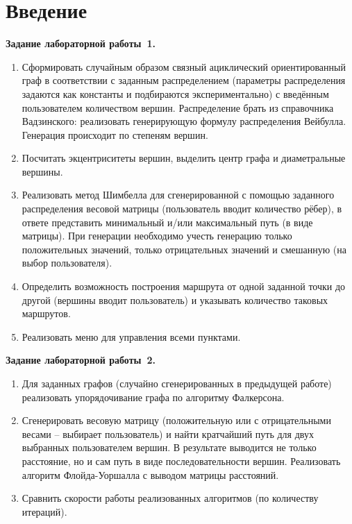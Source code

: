 \section*{Введение}

\textbf{Задание лабораторной работы~1.}
\begin{enumerate}
    \item Сформировать случайным образом связный ациклический ориентированный граф
    в соответствии с заданным распределением (параметры распределения задаются как
    константы и подбираются экспериментально) с введённым пользователем количеством
    вершин. Распределение брать из справочника Вадзинского: реализовать генерирующую
    формулу распределения Вейбулла. Генерация происходит по степеням вершин.

    \item Посчитать экцентриситеты вершин, выделить центр графа и диаметральные вершины.

    \item Реализовать метод Шимбелла для сгенерированной с помощью заданного распределения
    весовой матрицы (пользователь вводит количество рёбер), в ответе представить минимальный
    и/или максимальный путь (в виде матрицы). При генерации необходимо учесть генерацию
    только положительных значений, только отрицательных значений и смешанную (на выбор
    пользователя).

    \item Определить возможность построения маршрута от одной заданной точки до другой
    (вершины вводит пользователь) и указывать количество таковых маршрутов.

    \item Реализовать меню для управления всеми пунктами.
\end{enumerate}

\textbf{Задание лабораторной работы~2.}
\begin{enumerate}
    \item Для заданных графов (случайно сгенерированных в предыдущей работе)
    реализовать упорядочивание графа по алгоритму Фалкерсона.

    \item Сгенерировать весовую матрицу (положительную или с отрицательными весами --
    выбирает пользователь) и найти кратчайший путь для двух выбранных пользователем
    вершин. В результате выводится не только расстояние, но и сам путь в виде
    последовательности вершин. Реализовать алгоритм Флойда-Уоршалла с выводом матрицы
    расстояний.

    \item Сравнить скорости работы реализованных алгоритмов (по количеству итераций).
\end{enumerate}


